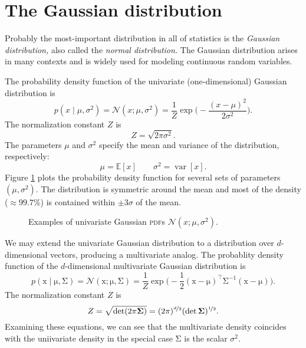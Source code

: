 \documentclass{article}
\newcommand{\acro}[1]{\textsc{\MakeLowercase{#1}}}
\newcommand{\given}{\mid}
\newcommand{\mc}[1]{\mathcal{#1}}
\newcommand{\inv}{^{-1}}
\newcommand{\trans}{^\top}
\newcommand{\mat}[1]{\bm{\mathrm{#1}}}
\renewcommand{\vec}[1]{\bm{\mathrm{#1}}}
\DeclareMathOperator{\var}{var}
\begin{document}
\section*{The Gaussian distribution}
Probably the most-important distribution in all of statistics is the
\emph{Gaussian distribution,} also called the \emph{normal
  distribution.}  The Gaussian distribution arises in many contexts
and is widely used for modeling continuous random variables.

The probability density function of the univariate (one-dimensional)
Gaussian distribution is
\begin{equation*}
  p(x \given \mu, \sigma^2)
  =
  \mc{N}(x; \mu, \sigma^2)
  =
  \frac{1}{Z}
  \exp\biggl(
  -\frac{(x - \mu)^2}{2 \sigma^2}
  \biggr).
\end{equation*}
The normalization constant $Z$ is
\begin{equation*}
  Z = \sqrt{2 \pi \sigma^2}.
\end{equation*}
The parameters $\mu$ and $\sigma^2$ specify the mean and variance
of the distribution, respectively:
\begin{equation*}
  \mu = \mathbb{E}[x] \qquad
  \sigma^2 = \var[x].
\end{equation*}
Figure \ref{1d_examples} plots the probability density function for
several sets of parameters $(\mu, \sigma^2)$.  The distribution is
symmetric around the mean and most of the density ($\approx 99.7\%$)
is contained within $\pm 3 \sigma$ of the mean.

\begin{figure}
  \centering
  
  \caption{Examples of univariate Gaussian \acro{PDF}s $\mc{N}(x; \mu,
    \sigma^2)$.}
  \label{1d_examples}
\end{figure}

We may extend the univariate Gaussian distribution to a distribution
over $d$-dimensional vectors, producing a multivariate analog.  The
probablity density function of the $d$-dimensional multivariate
Gaussian distribution is
\begin{equation*}
  p(\vec{x} \given \vec{\mu}, \mat{\Sigma})
  =
  \mc{N}(\vec{x}; \vec{\mu}, \mat{\Sigma})
  =
  \frac{1}{Z}
  \exp\biggl(
  -\frac{1}{2}
  (\vec{x} - \vec{\mu})\trans
  \mat{\Sigma}\inv
  (\vec{x} - \vec{\mu})
  \biggr).
\end{equation*}
The normalization constant $Z$ is
\begin{equation*}
  Z = \sqrt{\det (2 \pi \mat{\Sigma})}
    = (2 \pi)^{\nicefrac{d}{2}} (\det \mat{\Sigma})^{\nicefrac{1}{2}}.
\end{equation*}
Examining these equations, we can see that the multivariate density
coincides with the uniivariate density in the special case
$\mat{\Sigma}$ is the scalar $\sigma^2$.
\end{document}
